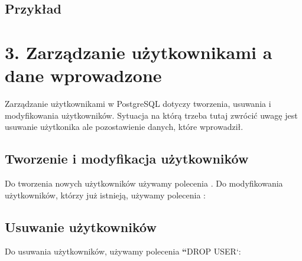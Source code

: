 \documentclass[a4paper,11pt,polish]{sphinxmanual}
\begin{document}
\subsection{Przykład}
\label{\detokenize{Bezpieczenstwo/index:przyklad}}
\begin{sphinxVerbatim}[commandchars=\\\{\}]
      
     
\end{sphinxVerbatim}


\section{3. Zarządzanie użytkownikami a dane wprowadzone}
\label{\detokenize{Bezpieczenstwo/index:zarzadzanie-uzytkownikami-a-dane-wprowadzone}}
\sphinxAtStartPar
Zarządzanie użytkownikami w PostgreSQL dotyczy tworzenia, usuwania i modyfikowania użytkowników. Sytuacja na którą trzeba tutaj zwrócić uwagę jest usuwanie użytkonika ale pozostawienie danych, które wprowadził.


\subsection{Tworzenie i modyfikacja użytkowników}
\label{\detokenize{Bezpieczenstwo/index:tworzenie-i-modyfikacja-uzytkownikow}}
\sphinxAtStartPar
Do tworzenia nowych użytkowników używamy polecenia . Do modyfikowania użytkowników, którzy już istnieją, używamy polecenia :

\begin{sphinxVerbatim}[commandchars=\\\{\}]
     
     
\end{sphinxVerbatim}


\subsection{Usuwanie użytkowników}
\label{\detokenize{Bezpieczenstwo/index:usuwanie-uzytkownikow}}
\sphinxAtStartPar
Do usuwania użytkowników, używamy polecenia {\color{red}\bfseries{}``}DROP USER`:
\end{document}
